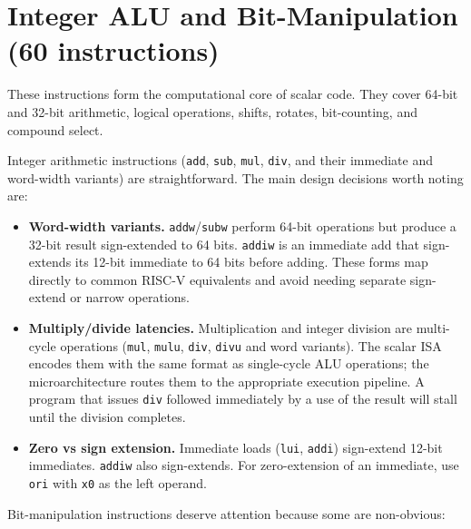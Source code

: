 \section{Integer ALU and Bit-Manipulation (60 instructions)}
These instructions form the computational core of scalar code. They cover 64-bit and 32-bit arithmetic, logical operations, shifts, rotates, bit-counting, and compound select.

Integer arithmetic instructions (\texttt{add}, \texttt{sub}, \texttt{mul}, \texttt{div}, and their immediate and word-width variants) are straightforward. The main design decisions worth noting are:

\begin{itemize}
  \item \textbf{Word-width variants.} \texttt{addw}/\texttt{subw} perform 64-bit operations but produce a 32-bit result sign-extended to 64 bits. \texttt{addiw} is an immediate add that sign-extends its 12-bit immediate to 64 bits before adding. These forms map directly to common RISC-V equivalents and avoid needing separate sign-extend or narrow operations.
  \item \textbf{Multiply/divide latencies.} Multiplication and integer division are multi-cycle operations (\texttt{mul}, \texttt{mulu}, \texttt{div}, \texttt{divu} and word variants). The scalar ISA encodes them with the same format as single-cycle ALU operations; the microarchitecture routes them to the appropriate execution pipeline. A program that issues \texttt{div} followed immediately by a use of the result will stall until the division completes.
  \item \textbf{Zero vs sign extension.} Immediate loads (\texttt{lui}, \texttt{addi}) sign-extend 12-bit immediates. \texttt{addiw} also sign-extends. For zero-extension of an immediate, use \texttt{ori} with \texttt{x0} as the left operand.
\end{itemize}

Bit-manipulation instructions deserve attention because some are non-obvious:


